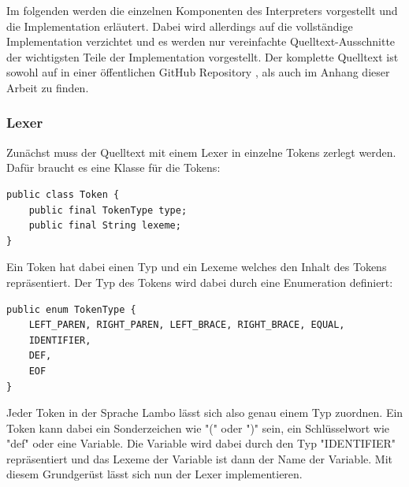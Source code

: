 \documentclass[ngerman]{article}
\begin{document}
Im folgenden werden die einzelnen Komponenten des Interpreters vorgestellt und die Implementation erläutert. Dabei wird allerdings auf die vollständige Implementation verzichtet und es werden nur vereinfachte Quelltext-Ausschnitte der wichtigsten Teile der Implementation vorgestellt. Der komplette Quelltext ist sowohl auf in einer öffentlichen GitHub Repository \cite{logithub}, als auch im Anhang dieser Arbeit zu finden.

\subsubsection{Lexer}

Zunächst muss der Quelltext mit einem Lexer in einzelne Tokens zerlegt werden. Dafür braucht es eine Klasse für die Tokens:
\begin{lstlisting}[caption={TODO: Referenz zu Anhang}, captionpos=b]
public class Token {
    public final TokenType type;
    public final String lexeme;
}
\end{lstlisting}
Ein Token hat dabei einen Typ und ein Lexeme welches den Inhalt des Tokens repräsentiert. Der Typ des Tokens wird dabei durch eine Enumeration definiert:
\begin{lstlisting}[caption={TODO: Referenz zu Anhang}, captionpos=b]
public enum TokenType {
    LEFT_PAREN, RIGHT_PAREN, LEFT_BRACE, RIGHT_BRACE, EQUAL,
    IDENTIFIER,
    DEF,
    EOF
}
\end{lstlisting}
Jeder Token in der Sprache Lambo lässt sich also genau einem Typ zuordnen. Ein Token kann dabei ein Sonderzeichen wie "(" oder ")" sein, ein Schlüsselwort wie "def" oder eine Variable. Die Variable wird dabei durch den Typ "IDENTIFIER" repräsentiert und das Lexeme der Variable ist dann der Name der Variable.
Mit diesem Grundgerüst lässt sich nun der Lexer implementieren.
\end{document}
